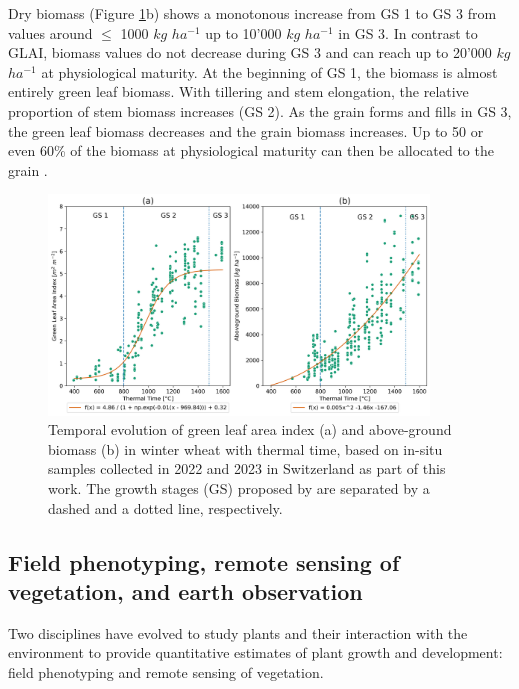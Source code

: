 Dry biomass (Figure \ref{fig:ww-growth-development}b) shows a monotonous increase from \gls{GS} 1 to \gls{GS} 3 from values around $\le$ 1000 $kg$ $ha^{-1}$ up to 10'000 $kg$ $ha^{-1}$ in \gls{GS} 3. In contrast to \gls{GLAI}, biomass values do not decrease during \gls{GS} 3 and can reach up to 20'000 $kg$ $ha^{-1}$ at physiological maturity. At the beginning of \gls{GS} 1, the biomass is almost entirely green leaf biomass. With tillering and stem elongation, the relative proportion of stem biomass increases (\gls{GS} 2). As the grain forms and fills in \gls{GS} 3, the green leaf biomass decreases and the grain biomass increases. Up to 50 or even 60\% of the biomass at physiological maturity can then be allocated to the grain \citep{long_meeting_2015}.

\begin{figure}[H]
    \centering
    \includegraphics[width=0.9\textwidth]{01-Introduction/img/glai_and_biomass_growth-stages.png}
    \caption{Temporal evolution of green leaf area index (a) and above-ground biomass (b) in winter wheat with thermal time, based on in-situ samples collected in 2022 and 2023 in Switzerland as part of this work. The growth stages (GS) proposed by \cite{kirby_analysis_1988} are separated by a dashed and a dotted line, respectively.}
    \label{fig:ww-growth-development}
\end{figure}

\subsection{Field phenotyping, remote sensing of vegetation, and earth observation}
\label{subsec:field-phenotyping-rs-eo}

Two disciplines have evolved to study plants and their interaction with the environment to provide quantitative estimates of plant growth and development: field phenotyping and remote sensing of vegetation.

